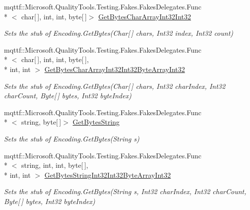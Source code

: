 \begin{DoxyCompactItemize}
mqttf\-::\-Microsoft.\-Quality\-Tools.\-Testing.\-Fakes.\-Fakes\-Delegates.\-Func\\*
$<$ char\mbox{[}$\,$\mbox{]}, int, int, byte\mbox{[}$\,$\mbox{]}$>$ \hyperlink{class_system_1_1_text_1_1_fakes_1_1_stub_encoding_a2c94d64b2e19dbb2789d45c2b5bc4cd7}{Get\-Bytes\-Char\-Array\-Int32\-Int32}
\begin{DoxyCompactList}\small\item\em Sets the stub of Encoding.\-Get\-Bytes(\-Char\mbox{[}$\,$\mbox{]} chars, Int32 index, Int32 count)\end{DoxyCompactList}\item 
mqttf\-::\-Microsoft.\-Quality\-Tools.\-Testing.\-Fakes.\-Fakes\-Delegates.\-Func\\*
$<$ char\mbox{[}$\,$\mbox{]}, int, int, byte\mbox{[}$\,$\mbox{]}, \\*
int, int $>$ \hyperlink{class_system_1_1_text_1_1_fakes_1_1_stub_encoding_acf1e557019dcd16ef873db7459dcd5d1}{Get\-Bytes\-Char\-Array\-Int32\-Int32\-Byte\-Array\-Int32}
\begin{DoxyCompactList}\small\item\em Sets the stub of Encoding.\-Get\-Bytes(\-Char\mbox{[}$\,$\mbox{]} chars, Int32 char\-Index, Int32 char\-Count, Byte\mbox{[}$\,$\mbox{]} bytes, Int32 byte\-Index)\end{DoxyCompactList}\item 
mqttf\-::\-Microsoft.\-Quality\-Tools.\-Testing.\-Fakes.\-Fakes\-Delegates.\-Func\\*
$<$ string, byte\mbox{[}$\,$\mbox{]}$>$ \hyperlink{class_system_1_1_text_1_1_fakes_1_1_stub_encoding_ad51980b5f5c2625fb0a2f1e3c323e442}{Get\-Bytes\-String}
\begin{DoxyCompactList}\small\item\em Sets the stub of Encoding.\-Get\-Bytes(\-String s)\end{DoxyCompactList}\item 
mqttf\-::\-Microsoft.\-Quality\-Tools.\-Testing.\-Fakes.\-Fakes\-Delegates.\-Func\\*
$<$ string, int, int, byte\mbox{[}$\,$\mbox{]}, \\*
int, int $>$ \hyperlink{class_system_1_1_text_1_1_fakes_1_1_stub_encoding_abbe18ecafa27562e2e4a7d32a9c0bc34}{Get\-Bytes\-String\-Int32\-Int32\-Byte\-Array\-Int32}
\begin{DoxyCompactList}\small\item\em Sets the stub of Encoding.\-Get\-Bytes(\-String s, Int32 char\-Index, Int32 char\-Count, Byte\mbox{[}$\,$\mbox{]} bytes, Int32 byte\-Index)\end{DoxyCompactList}\item 

\end{DoxyCompactItemize}
